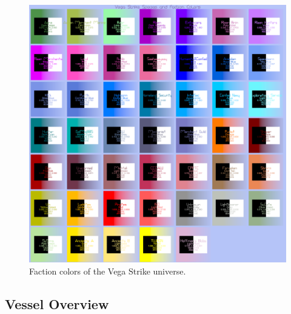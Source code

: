 \begin{figure} \begin{center}
    \includegraphics[width=1.0\textwidth]{../images/FactionColors_V1.png}
    \caption{Faction colors of the Vega Strike universe.}
    \label{fig:faction-colors}
\end{center} \end{figure}



\subsection{Vessel Overview}

